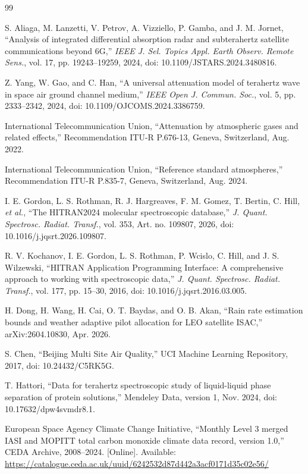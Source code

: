 \documentclass[conference]{IEEEtran}
\begin{document}
\begin{thebibliography}{99}

S. Aliaga, M. Lanzetti, V. Petrov, A. Vizziello, P. Gamba, and J. M. Jornet, ``Analysis of integrated differential absorption radar and subterahertz satellite communications beyond 6G,'' \emph{IEEE J. Sel. Topics Appl. Earth Observ. Remote Sens.}, vol. 17, pp. 19243--19259, 2024, doi: 10.1109/JSTARS.2024.3480816.

Z. Yang, W. Gao, and C. Han, ``A universal attenuation model of terahertz wave in space air ground channel medium,'' \emph{IEEE Open J. Commun. Soc.}, vol. 5, pp. 2333--2342, 2024, doi: 10.1109/OJCOMS.2024.3386759.

International Telecommunication Union, ``Attenuation by atmospheric gases and related effects,'' Recommendation ITU-R P.676-13, Geneva, Switzerland, Aug. 2022.

International Telecommunication Union, ``Reference standard atmospheres,'' Recommendation ITU-R P.835-7, Geneva, Switzerland, Aug. 2024.

I. E. Gordon, L. S. Rothman, R. J. Hargreaves, F. M. Gomez, T. Bertin, C. Hill, \emph{et al.}, ``The HITRAN2024 molecular spectroscopic database,'' \emph{J. Quant. Spectrosc. Radiat. Transf.}, vol. 353, Art. no. 109807, 2026, doi: 10.1016/j.jqsrt.2026.109807.

R. V. Kochanov, I. E. Gordon, L. S. Rothman, P. Wcislo, C. Hill, and J. S. Wilzewski, ``HITRAN Application Programming Interface: A comprehensive approach to working with spectroscopic data,'' \emph{J. Quant. Spectrosc. Radiat. Transf.}, vol. 177, pp. 15--30, 2016, doi: 10.1016/j.jqsrt.2016.03.005.

H. Dong, H. Wang, H. Cai, O. T. Baydas, and O. B. Akan, ``Rain rate estimation bounds and weather adaptive pilot allocation for LEO satellite ISAC,'' arXiv:2604.10830, Apr. 2026.

S. Chen, ``Beijing Multi Site Air Quality,'' UCI Machine Learning Repository, 2017, doi: 10.24432/C5RK5G.

T. Hattori, ``Data for terahertz spectroscopic study of liquid-liquid phase separation of protein solutions,'' Mendeley Data, version 1, Nov. 2024, doi: 10.17632/dpw4svmdr8.1.

European Space Agency Climate Change Initiative, ``Monthly Level 3 merged IASI and MOPITT total carbon monoxide climate data record, version 1.0,'' CEDA Archive, 2008--2024. [Online]. Available: \url{https://catalogue.ceda.ac.uk/uuid/6242532d87d442a3acf0171d35c02e56/}


\end{thebibliography}
\end{document}

